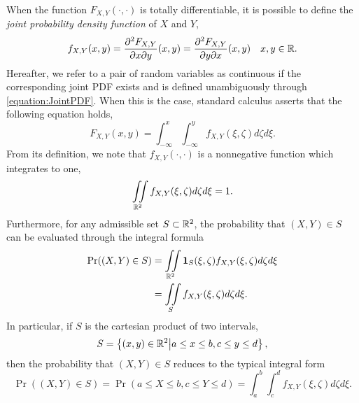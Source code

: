When the function $F_{X,Y} (\cdot, \cdot)$ is totally differentiable, it is possible to define the \emph{joint probability density function} of $X$ and $Y$, 
\begin{equation} \label{equation:JointPDF}
f_{X,Y} (x,y) = \frac{\partial^2 F_{X,Y}}{\partial x \partial y} (x,y)
= \frac{\partial^2 F_{X,Y}}{\partial y \partial x} (x,y) \quad x,y \in  \mathbb{R} .
\end{equation}
Hereafter, we refer to a pair of random variables as continuous if the corresponding joint PDF exists and is defined unambiguously through \eqref{equation:JointPDF}.
When this is the case, standard calculus asserts that the following equation holds,
\begin{equation*}
F_{X,Y} (x,y) = \int_{-\infty}^x \int_{-\infty}^y f_{X,Y} (\xi,\zeta) d\zeta d\xi .
\end{equation*}
From its definition, we note that $f_{X,Y} (\cdot, \cdot)$ is a nonnegative function which integrates to one,
\begin{equation*}
\iint\limits_{\mathbb{R}^2}
f_{X, Y} (\xi, \zeta) d\zeta d\xi = 1.
\end{equation*}
Furthermore, for any admissible set $S \subset \mathbb{R}^2$, the probability that $(X,Y) \in S$ can be evaluated through the integral formula
\begin{equation} \label{equation:ProbabilityJointPDF}
\begin{split}
\Pr ((X,Y) \in S)
&= \iint\limits_{\mathbb{R}^2}
\mathbf{1}_{S} (\xi, \zeta) f_{X, Y} (\xi, \zeta) d\zeta d\xi \\
&= \iint\limits_{S}
f_{X, Y} (\xi, \zeta) d\zeta d\xi .
\end{split}
\end{equation}
In particular, if $S$ is the cartesian product of two intervals, 
\begin{equation*}
S = \left\{ (x,y) \in \mathbb{R}^2 \big| a \leq x \leq b, c \leq y \leq d \right\} ,
\end{equation*}
then the probability that $(X,Y) \in S$ reduces to the typical integral form
\begin{equation*}
\Pr ((X,Y) \in S)
= \Pr (a \leq X \leq b, c \leq Y \leq d)
= \int_{a}^{b} \int_{c}^{d}
f_{X, Y} (\xi, \zeta) d\zeta d\xi .
\end{equation*}

